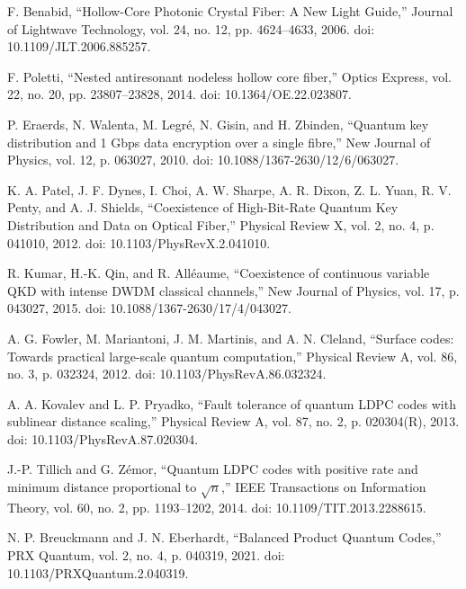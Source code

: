 \documentclass[conference]{IEEEtran}
\begin{document}
\begin{thebibliography}{99}

F. Benabid, ``Hollow-Core Photonic Crystal Fiber: A New Light Guide,'' Journal of Lightwave Technology, vol. 24, no. 12, pp. 4624--4633, 2006. doi: 10.1109/JLT.2006.885257.

F. Poletti, ``Nested antiresonant nodeless hollow core fiber,'' Optics Express, vol. 22, no. 20, pp. 23807--23828, 2014. doi: 10.1364/OE.22.023807.

P. Eraerds, N. Walenta, M. Legré, N. Gisin, and H. Zbinden, ``Quantum key distribution and 1 Gbps data encryption over a single fibre,'' New Journal of Physics, vol. 12, p. 063027, 2010. doi: 10.1088/1367-2630/12/6/063027.

K. A. Patel, J. F. Dynes, I. Choi, A. W. Sharpe, A. R. Dixon, Z. L. Yuan, R. V. Penty, and A. J. Shields, ``Coexistence of High-Bit-Rate Quantum Key Distribution and Data on Optical Fiber,'' Physical Review X, vol. 2, no. 4, p. 041010, 2012. doi: 10.1103/PhysRevX.2.041010.

R. Kumar, H.-K. Qin, and R. Alléaume, ``Coexistence of continuous variable QKD with intense DWDM classical channels,'' New Journal of Physics, vol. 17, p. 043027, 2015. doi: 10.1088/1367-2630/17/4/043027.

A. G. Fowler, M. Mariantoni, J. M. Martinis, and A. N. Cleland, ``Surface codes: Towards practical large-scale quantum computation,'' Physical Review A, vol. 86, no. 3, p. 032324, 2012. doi: 10.1103/PhysRevA.86.032324.

A. A. Kovalev and L. P. Pryadko, ``Fault tolerance of quantum LDPC codes with sublinear distance scaling,'' Physical Review A, vol. 87, no. 2, p. 020304(R), 2013. doi: 10.1103/PhysRevA.87.020304.

J.-P. Tillich and G. Zémor, ``Quantum LDPC codes with positive rate and minimum distance proportional to $\sqrt{n}$,'' IEEE Transactions on Information Theory, vol. 60, no. 2, pp. 1193--1202, 2014. doi: 10.1109/TIT.2013.2288615.

N. P. Breuckmann and J. N. Eberhardt, ``Balanced Product Quantum Codes,'' PRX Quantum, vol. 2, no. 4, p. 040319, 2021. doi: 10.1103/PRXQuantum.2.040319.


\end{thebibliography}
\end{document}
